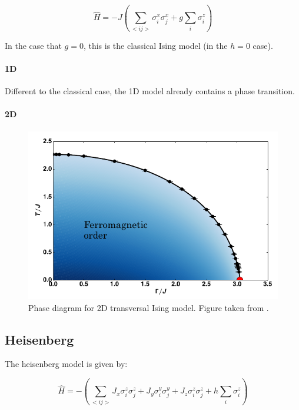 \begin{equation}
    \hat{H} = -J \left (  \sum_{<i j>} \sigma^x_i \sigma^x_j + g \sum_i \sigma^z_i \right )
\end{equation}

In the case that $g=0$, this is the classical Ising model (in the $h=0$ case).

\paragraph{1D}
Different to the classical case, the 1D model already contains a phase transition.

\paragraph{2D}

\begin{figure}
    \center
    \includegraphics[width=\textwidth]{Figuren/phsyics/2disingphase.png}
    \caption{Phase diagram for 2D transversal Ising model. Figure taken from \cite{Hesselmann2016}.}
    \label{2dtisingphasediag}
\end{figure}

\subsection{Heisenberg}

The heisenberg model is given by:

\begin{equation}
    \hat{H} =  -\left( \sum_{<i j>} J_x \sigma^z_i \sigma^z_j + J_y \sigma^y_i \sigma^y_j+ J_z \sigma^z_i \sigma^z_j + h \sum_i \sigma^z_i \right )
\end{equation}

